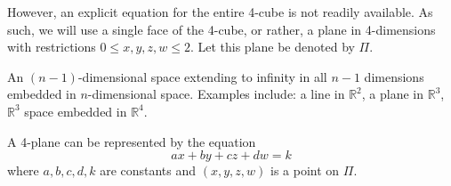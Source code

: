 However, an explicit equation for the entire 4-cube is not readily available. As such, we will use a single face of the 4-cube, or rather, a plane in 4-dimensions with restrictions $0\leq x, y, z, w \leq 2$. Let this plane be denoted by $\Pi$.
\begin{definition}[$n$-Plane]
    An $(n-1)$-dimensional space extending to infinity in all $n-1$ dimensions embedded in $n$-dimensional space. Examples include: a line in $\mathbb{R}^2$, a plane in $\mathbb{R}^3$, $\mathbb{R}^3$ space embedded in $\mathbb{R}^4$.
\end{definition}
\begin{lemma}
A 4-plane can be represented by the equation \begin{equation}\label{eq:4-plane}
    ax+by+cz+dw=k
\end{equation}
where $a, b, c, d, k$ are constants and $(x, y, z, w)$ is a point on $\Pi$. 
\end{lemma}
